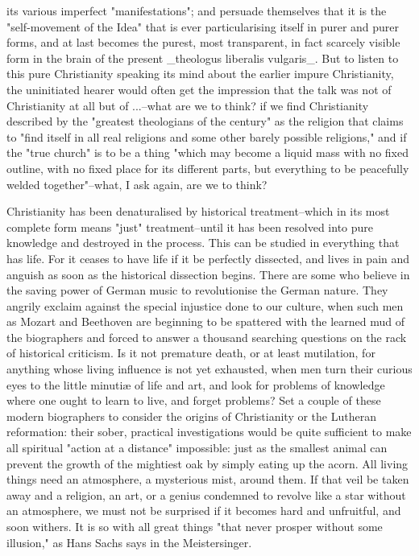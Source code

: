 its various imperfect "manifestations"; and persuade themselves that
it is the "self-movement of the Idea" that is ever particularising
itself in purer and purer forms, and at last becomes the purest, most
transparent, in fact scarcely visible form in the brain of the
present _theologus liberalis vulgaris_. But to listen to this pure
Christianity speaking its mind about the earlier impure Christianity,
the uninitiated hearer would often get the impression that the talk
was not of Christianity at all but of ...--what are we to think? if
we find Christianity described by the "greatest theologians of the
century" as the religion that claims to "find itself in all real
religions and some other barely possible religions," and if the "true
church" is to be a thing "which may become a liquid mass with no
fixed outline, with no fixed place for its different parts, but
everything to be peacefully welded together"--what, I ask again, are
we to think?

Christianity has been denaturalised by historical treatment--which in
its most complete form means "just" treatment--until it has been
resolved into pure knowledge and destroyed in the process. This can
be studied in everything that has life. For it ceases to have life if
it be perfectly dissected, and lives in pain and anguish as soon as
the historical dissection begins. There are some who believe in the
saving power of German music to revolutionise the German nature. They
angrily exclaim against the special injustice done to our culture,
when such men as Mozart and Beethoven are beginning to be spattered
with the learned mud of the biographers and forced to answer a
thousand searching questions on the rack of historical criticism. Is
it not premature death, or at least mutilation, for anything whose
living influence is not yet exhausted, when men turn their curious
eyes to the little minutiæ of life and art, and look for problems of
knowledge where one ought to learn to live, and forget problems? Set
a couple of these modern biographers to consider the origins of
Christianity or the Lutheran reformation: their sober, practical
investigations would be quite sufficient to make all spiritual
"action at a distance" impossible: just as the smallest animal can
prevent the growth of the mightiest oak by simply eating up the
acorn. All living things need an atmosphere, a mysterious mist,
around them. If that veil be taken away and a religion, an art, or a
genius condemned to revolve like a star without an atmosphere, we
must not be surprised if it becomes hard and unfruitful, and soon
withers. It is so with all great things "that never prosper without
some illusion," as Hans Sachs says in the Meistersinger.


